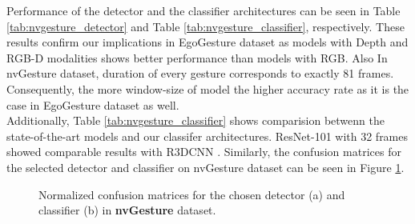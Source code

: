 Performance of the detector and the classifier architectures can be seen in Table \ref{tab:nvgesture_detector} and Table \ref{tab:nvgesture_classifier}, respectively. These results confirm our implications in EgoGesture dataset as models with Depth and RGB-D modalities shows better performance than models with RGB. Also In nvGesture dataset, duration of every gesture corresponds to exactly 81 frames. Consequently, the more window-size of model the higher accuracy rate as it is the case in EgoGesture dataset as well. \\

Additionally, Table \ref{tab:nvgesture_classifier} shows comparision betwenn the state-of-the-art models and our classifer architectures. ResNet-101 with 32 frames showed comparable results with R3DCNN \cite{molchanov_online_2016}. Similarly, the confusion matrices for the selected detector and classifier on nvGesture dataset can be seen in Figure \ref{fig:nvcm}.\\
\begin{figure}[h!]%
\centering
{}%
\label{fig:staego}%
\qquad
{}%
\caption{Normalized confusion matrices for the chosen detector (a) and classifier (b) in \textbf{nvGesture} dataset.}
\label{fig:nvcm}
\end{figure}

